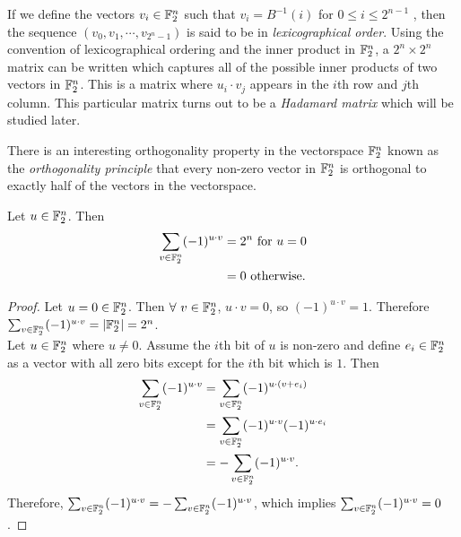 \par If we define the vectors $v_i\in\mathbb{F}_2^n$ such that $v_i=B^{-1}(i)$ for $0\leq i\leq2^{n-1}$
, then the sequence $(v_0,v_1,\cdots,v_{2^n-1})$ is said to be in {\em lexicographical order}.
Using the convention of lexicographical ordering and the inner product in $\mathbb{F}_2^n$, a $2^n\times 2^n$
matrix can be written which captures all of the possible inner products of two vectors in
$\mathbb{F}_2^n$. This is a matrix where $u_i\cdot v_j$ appears in the $i$th row and $j$th column.
This particular matrix turns out to be a {\em Hadamard matrix} which will be studied later.

\par There is an interesting orthogonality property in the vectorspace $\mathbb{F}_2^n$ known as the
{\em orthogonality principle} that every non-zero vector in $\mathbb{F}_2^n$ is orthogonal to
exactly half of the vectors in the vectorspace.

\begin{theorem}
	\label{thm:orthogonality-principle}
	Let $u\in\mathbb{F}_2^n$. Then
	\begin{align*}
		\sum_{v\in\mathbb{F}_2^n}(-1)^{u\cdot v} &= 2^n {\rm \ for\ } u=0 \\
		                                   &= 0 {\rm \ otherwise.}
  \end{align*}
\end{theorem}

\begin{proof}
	Let $u=0\in\mathbb{F}_2^n$. Then $\forall\ v\in\mathbb{F}_2^n$, $u\cdot v=0$, so
	$(-1)^{u\cdot v}=1$. Therefore $\sum_{v\in\mathbb{F}_2^n}(-1)^{u\cdot v}=\lvert\mathbb{F}_2^n\rvert=2^n$. \\

	Let $u\in\mathbb{F}_2^n$ where $u\not=0$. Assume the $i$th bit of $u$ is non-zero and
	define $e_i\in\mathbb{F}_2^n$ as a vector with all zero bits except for the $i$th bit which is $1$. Then
	\begin{align*}
		\sum_{v\in\mathbb{F}_2^n}(-1)^{u\cdot v} &= \sum_{v\in\mathbb{F}_2^n}(-1)^{u\cdot (v+e_i)} \\
		                                   &= \sum_{v\in\mathbb{F}_2^n}(-1)^{u\cdot v}(-1)^{u\cdot e_i} \\
																			 &= -\sum_{v\in\mathbb{F}_2^n}(-1)^{u\cdot v}.
  \end{align*}
	Therefore, $\sum_{v\in\mathbb{F}_2^n}(-1)^{u\cdot v}=-\sum_{v\in\mathbb{F}_2^n}(-1)^{u\cdot v}$, which implies
	$\sum_{v\in\mathbb{F}_2^n}(-1)^{u\cdot v}=0$.
\end{proof}

